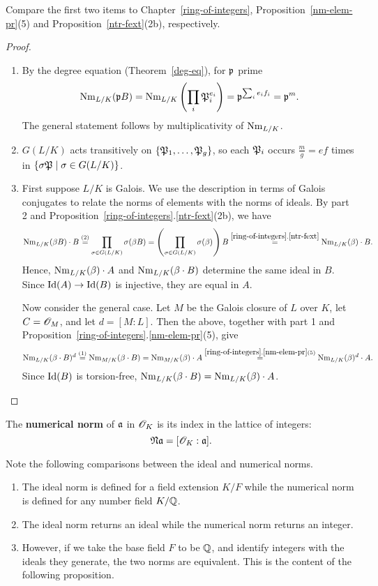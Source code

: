 Compare the first two items to Chapter~\ref{ring-of-integers}, Proposition~\ref{nm-elem-pr}(5) and Proposition~\ref{ntr-fext}(2b), respectively.
\begin{proof}$\,$
\begin{enumerate}
\item
By the degree equation (Theorem~\ref{deg-eq}), for $\mathfrak{p}$ prime
\[
\operatorname{Nm}_{L/K}(\mathfrak{p} B)=\operatorname{Nm}_{L/K}\left( {\prod_i \mathfrak{P}_i^{e_i}} \right)=\mathfrak{p}^{\sum_{i} e_if_i}=\mathfrak{p}^m.
\]
The general statement follows by multiplicativity of $\operatorname{Nm}_{L/K}$.
\item $G(L/K)$ acts transitively on $\{\mathfrak{P}_1,\ldots, \mathfrak{P}_g\}$, so each $\mathfrak{P}_i$ occurs $\frac{m}{g}=ef$ times in $\{\sigma \mathfrak{P}\mid \sigma\in G(L/K)\}$.
\item 
First suppose $L/K$ is Galois. We use the description in terms of Galois conjugates to relate the norms of elements with the norms of ideals.
By part 2 and Proposition~\ref{ring-of-integers}.\ref{ntr-fext}(2b), we have
\[
\operatorname{Nm}_{L/K}(\beta B)\cdot B\stackrel{(2)}=\prod_{\sigma\in G(L/K)} \sigma(\beta B) =\left( {\prod_{\sigma\in G(L/K)}\sigma(\beta)} \right)B\stackrel{\ref{ring-of-integers}.\ref{ntr-fext}}=\operatorname{Nm}_{L/K}(\beta) \cdot B.
\]
Hence, $\operatorname{Nm}_{L/K}(\beta)\cdot A$ and $\operatorname{Nm}_{L/K}(\beta\cdot B)$ determine the same ideal in $B$. Since $\operatorname{Id}(A)\to \operatorname{Id}(B)$ is injective, they are equal in $A$.

Now consider the general case. Let $M$ be the Galois closure of $L$ over $K$, let $C=\mathscr{O}_M$, and let $d=[M:L]$. Then the above, together with part 1 and Proposition~\ref{ring-of-integers}.\ref{nm-elem-pr}(5), give
\[
\operatorname{Nm}_{L/K}(\beta\cdot B)^d\stackrel{(1)}= \operatorname{Nm}_{M/K}(\beta\cdot B)=\operatorname{Nm}_{M/K}(\beta) \cdot A \stackrel{\ref{ring-of-integers}.\ref{nm-elem-pr}(5)}= \operatorname{Nm}_{L/K}(\beta)^d\cdot A.
\]
Since $\operatorname{Id}(B)$ is torsion-free, $\operatorname{Nm}_{L/K}(\beta\cdot B)=\operatorname{Nm}_{L/K}(\beta)\cdot A$.\qedhere
\end{enumerate}
\end{proof}
\begin{df}
The \textbf{numerical norm} of $\mathfrak{a}$ in $\mathscr{O}_K$ is its index in the lattice of integers:
\[
\mathfrak N \mathfrak{a} =[\mathscr{O}_K:\mathfrak{a}].
\]
\end{df}
Note the following comparisons between the ideal and numerical norms.
\begin{enumerate}
\item The ideal norm is defined for a field extension $K/F$ while the numerical norm is defined for any number field $K/\mathbb{Q}$.
\item The ideal norm returns an ideal while the numerical norm returns an integer.
\item However, if we take the base field $F$ to be $\mathbb{Q}$, and identify integers with the ideals they generate, the two norms are equivalent. This is the content of the following proposition.
\end{enumerate}
